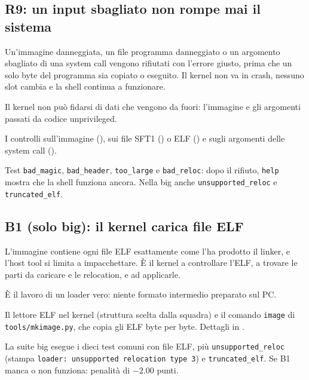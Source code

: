 \subsection{R9: un input sbagliato non rompe mai il sistema}
\begin{description}\sloppy
\item[Che cosa chiede] Un'immagine danneggiata, un file programma danneggiato o un argomento sbagliato di una system call vengono rifiutati con l'errore giusto, prima che un solo byte del programma sia copiato o eseguito. Il kernel non va in crash, nessuno slot cambia e la shell continua a funzionare.
\item[Perché serve] Il kernel non può fidarsi di dati che vengono da fuori: l'immagine e gli argomenti passati da codice unprivileged.
\item[Dove si interviene] I controlli sull'immagine (), sui file SFT1 () o ELF () e sugli argomenti delle system call ().
\item[Come si verifica] Test \texttt{bad\_magic}, \texttt{bad\_header}, \texttt{too\_large} e \texttt{bad\_reloc}: dopo il rifiuto, \texttt{help} mostra che la shell funziona ancora. Nella big anche \texttt{unsupported\_reloc} e \texttt{truncated\_elf}.
\end{description}

\subsection{B1 (solo big): il kernel carica file ELF}
\begin{description}\sloppy
\item[Che cosa chiede] L'immagine contiene ogni file ELF esattamente come l'ha prodotto il linker, e l'host tool si limita a impacchettare. È il kernel a controllare l'ELF, a trovare le parti da caricare e le relocation, e ad applicarle.
\item[Perché serve] È il lavoro di un loader vero: niente formato intermedio preparato sul PC.
\item[Dove si interviene] Il lettore ELF nel kernel (struttura scelta dalla squadra) e il comando \texttt{image} di \texttt{tools/mkimage.py}, che copia gli ELF byte per byte. Dettagli in .
\item[Come si verifica] La suite big esegue i dieci test comuni con file ELF, più \texttt{unsupported\_reloc} (stampa \texttt{loader:\ unsupported relocation type 3}) e \texttt{truncated\_elf}. Se B1 manca o non funziona: penalità di $-2.00$ punti.
\end{description}


